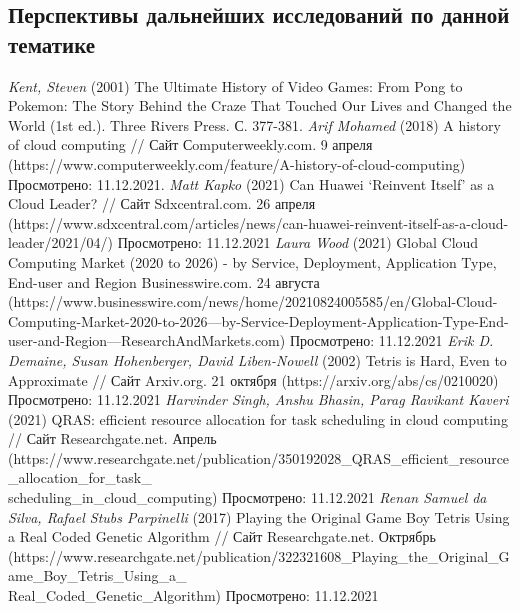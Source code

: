 \documentclass{article}
\begin{document}
\newpage
\begin{center}
\section {Перспективы дальнейших исследований по данной тематике}
\end{center}
\newpage
\begin{center}
\begin{thebibliography}{}
  \textit{Kent, Steven} (2001) The Ultimate History of Video Games: From Pong to Pokemon: The Story Behind the Craze That Touched Our Lives and Changed the World (1st ed.). Three Rivers Press. С. 377-381. 
      \textit{Arif Mohamed} (2018) A history of cloud computing // Сайт Сomputerweekly.com. 9 апреля (https://www.computerweekly.com/feature/A-history-of-cloud-computing) Просмотрено: 11.12.2021.
      \textit{Matt Kapko} (2021) Can Huawei ‘Reinvent Itself’ as a Cloud Leader? // Сайт Sdxcentral.com. 26 апреля (https://www.sdxcentral.com/articles/news/can-huawei-reinvent-itself-as-a-cloud-leader/2021/04/) Просмотрено: 11.12.2021
     \textit{Laura Wood} (2021) Global Cloud Computing Market (2020 to 2026) - by Service, Deployment, Application Type, End-user and Region Businesswire.com. 24 августа (https://www.businesswire.com/news/home/20210824005585/en/Global-Cloud-Computing-Market-2020-to-2026---by-Service-Deployment-Application-Type-End-user-and-Region---ResearchAndMarkets.com) Просмотрено: 11.12.2021
  \textit{Erik D. Demaine, Susan Hohenberger, David Liben-Nowell} (2002) Tetris is Hard, Even to Approximate // Сайт Arxiv.org. 21 октября (https://arxiv.org/abs/cs/0210020) Просмотрено: 11.12.2021
  \textit{Harvinder Singh, Anshu Bhasin, Parag Ravikant Kaveri} (2021) QRAS: efficient resource allocation for task scheduling in cloud computing // Сайт Researchgate.net. Апрель (https://www.researchgate.net/publication/350192028\_QRAS\_efficient\_resource\_allocation\_for\_task\_\\scheduling\_in\_cloud\_computing) Просмотрено: 11.12.2021
 \textit{Renan Samuel da Silva, Rafael Stubs Parpinelli} (2017) Playing the Original Game Boy Tetris Using a Real Coded Genetic Algorithm // Сайт Researchgate.net. Октрябрь (https://www.researchgate.net/publication/322321608\_Playing\_the\_Original\_Game\_Boy\_Tetris\_Using\_a\_\\Real\_Coded\_Genetic\_Algorithm) Просмотрено: 11.12.2021

\end{thebibliography}
\end{center}
\end{document}
